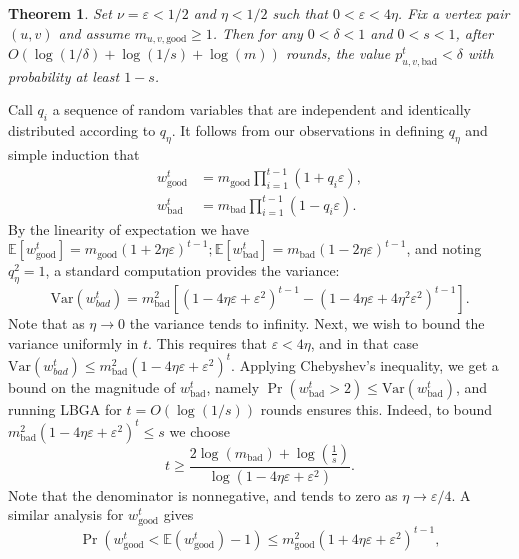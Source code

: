 \documentclass{IEEEtran}
\newtheorem{thm}{Theorem}
\begin{document}
\begin{thm}

Set $\nu = \varepsilon < 1/2$ and $\eta < 1/2$ such that $0 < \varepsilon <
4\eta$.  Fix a vertex pair $(u,v)$ and assume $m_{u,v,\text{good}} \geq 1$.
Then for any $0 < \delta < 1$ and $0 < s < 1$, after $O(\log(1 / \delta) +
\log(1/s) + \log(m))$ rounds, the value $p_{u,v,\text{bad}}^t < \delta$ with
probability at least $1-s$.  \label{thm:probabilistic-oracle} 

\end{thm}


\begin{IEEEproof}
Call $q_i$ a sequence of random variables that are independent and identically
distributed according to $q_\eta$. It follows from our observations in defining
$q_\eta$ and simple induction that 
$$ 
   \begin{aligned}
      w_{\text{good}}^t &= m_{\text{good}} \prod_{i=1}^{t-1}(1 + q_i \varepsilon), \\ 
      w_{\text{bad}}^t &= m_{\text{bad}} \prod_{i=1}^{t-1}(1 - q_i \varepsilon).
   \end{aligned}
$$ 
By the linearity of expectation we have $ \mathbb{E}[w_{\text{good}}^t] =
m_{\text{good}} (1 + 2 \eta \varepsilon)^{t-1}; \mathbb{E}[w_{\text{bad}}^t] =
m_{\text{bad}} (1 - 2 \eta \varepsilon)^{t-1} $, and noting $q_\eta^2 = 1$, a
standard computation provides the variance: 
$$
    \text{Var}(w_{bad}^t) = m_{\text{bad}}^2 [(1 - 4 \eta \varepsilon +
\varepsilon^2)^{t-1} - (1 - 4 \eta \varepsilon + 4 \eta^2 \varepsilon^2)^{t-1}].
$$
Note that as $\eta \to 0$ the variance tends to infinity. Next, we wish to
bound the variance uniformly in $t$. This requires that $\varepsilon < 4 \eta$,
and in that case $ \text{Var}(w_{bad}^t) \leq m_{\text{bad}}^2 (1 - 4\eta
\varepsilon + \varepsilon^2)^t $. Applying Chebyshev's inequality, we get a
bound on the magnitude of $w_{\text{bad}}^t$, namely $\Pr(w_{\text{bad}}^t > 2)
\leq \text{Var}(w_{\text{bad}}^t)$, and running LBGA for $t = O(\log(1/s))$
rounds ensures this. Indeed, to bound $
    m_{\text{bad}}^2(1 - 4 \eta \varepsilon + \varepsilon^2)^t \leq s
$ we choose
$$
    t \geq \frac{2\log(m_{\text{bad}}) + \log \left ( \frac{1}{s} \right
)}{\log \left ( 1 - 4 \eta \varepsilon + \varepsilon^2 \right )}.
$$
Note that the denominator is nonnegative, and tends to zero as $\eta \to
\varepsilon/4$. A similar analysis for $w_{\text{good}}^t$ gives
$$
        \Pr(w_{\text{good}}^t < \mathbb{E}(w^t_{\text{good}}) - 1) \leq m_{\text{good}}^2(1 + 4\eta \varepsilon + \varepsilon^2)^{t-1},
$$
\end{IEEEproof}
\end{document}
